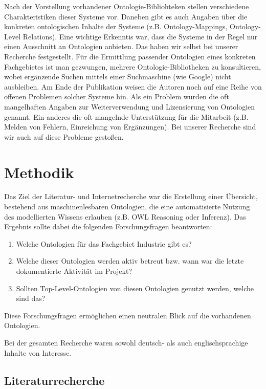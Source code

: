 \documentclass{article}
\begin{document}
Nach der Vorstellung vorhandener Ontologie-Bibliohteken stellen verschiedene Charakteristiken dieser Systeme vor.
Daneben gibt es auch Angaben über die konkreten ontologischen Inhalte der Systeme (z.B. Ontology-Mappings, Ontology-Level Relations).
Eine wichtige Erkenntis war, dass die Systeme in der Regel nur einen Ausschnitt an Ontologien anbieten.
Das haben wir selbst bei unserer Recherche festgestellt.
Für die Ermittlung passender Ontologien eines konkreten Fachgebietes ist man gezwungen, mehrere Ontologie-Bibliotheken zu konsultieren, wobei ergänzende Suchen mittels einer Suchmaschine (wie Google) nicht ausbleiben.
Am Ende der Publikation weisen die Autoren noch auf eine Reihe von offenen Problemen solcher Systeme hin.
Als ein Problem wurden die oft mangelhaften Angaben zur Weiterverwendung und Lizensierung von Ontologien genannt.
Ein anderes die oft mangelnde Unterstützung für die Mitarbeit (z.B. Melden von Fehlern, Einreichung von Ergänzungen).
Bei unserer Recherche sind wir auch auf diese Probleme gestoßen.

\section{Methodik}

Das Ziel der Literatur- und Internetrecherche war die Erstellung einer Übersicht, bestehend aus maschinenlesbaren Ontologien, die eine automatisierte Nutzung des modellierten Wissens erlauben (z.B. OWL Reasoning oder Inferenz).
Das Ergebnis sollte dabei die folgenden Forschungsfragen beantworten:

\begin{enumerate}
    \item Welche Ontologien für das Fachgebiet Industrie gibt es?
    \item Welche dieser Ontologien werden aktiv betreut bzw. wann war die letzte dokumentierte Aktivität im Projekt?
    \item Sollten Top-Level-Ontologien von diesen Ontologien genutzt werden, welche sind das?
\end{enumerate}

Diese Forschungsfragen ermöglichen einen neutralen Blick auf die vorhandenen Ontologien.

Bei der gesamten Recherche waren sowohl deutsch- als auch englischsprachige Inhalte von Interesse.

\subsection{Literaturrecherche}
\end{document}
